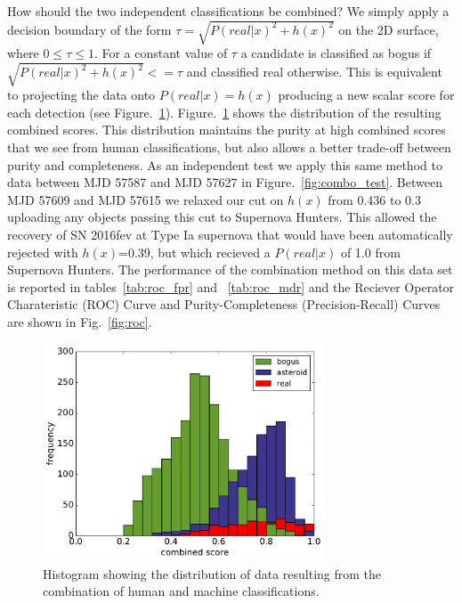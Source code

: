 \documentclass[a4paper,fleqn,usenatbib]{mnras}
\begin{document}

How should the two independent classifications be combined?  We simply apply a decision boundary of the form $\tau = \sqrt{P(real|x)^2 + h(x)^2}$ on the 2D surface, where $0\leq\tau\leq1$.  For a constant value of $\tau$ a candidate is classified as bogus if $\sqrt{P(real|x)^2 + h(x)^2} <= \tau$ and classified real otherwise.  This is equivalent to projecting the data onto $P(real|x)=h(x)$ producing a new scalar score for each detection (see Figure.~\ref{fig:combo_hist}).  Figure.~\ref{fig:combo_hist} shows the distribution of the resulting combined scores.  This distribution maintains the purity at high combined scores that we see from human classifications, but also allows a better trade-off between purity and completeness.  As an independent test we apply this same method to data between MJD 57587 and MJD 57627 in
Figure.~\ref{fig:combo_test}.  Between MJD 57609 and MJD 57615 we relaxed our cut on $h(x)$ from 0.436 to 0.3 uploading any objects passing this cut to Supernova Hunters.  This allowed the recovery of SN 2016fev at Type Ia supernova that would have been automatically rejected with $h(x)$=0.39, but which recieved a $P(real|x)$ of 1.0 from Supernova Hunters.  The performance of the combination method on this data set is reported in tables~\ref{tab:roc_fpr} and ~\ref{tab:roc_mdr} and the Reciever Operator Charateristic (ROC) Curve and Purity-Completeness (Precision-Recall) Curves are shown in Fig.~\ref{fig:roc}.

\begin{figure}
   \includegraphics[width=84mm]{figs/combo_hist.pdf}
   \caption{Histogram showing the distribution of data resulting from the combination of human and machine classifications.}
   \label{fig:combo_hist} 
\end{figure}
\end{document}
